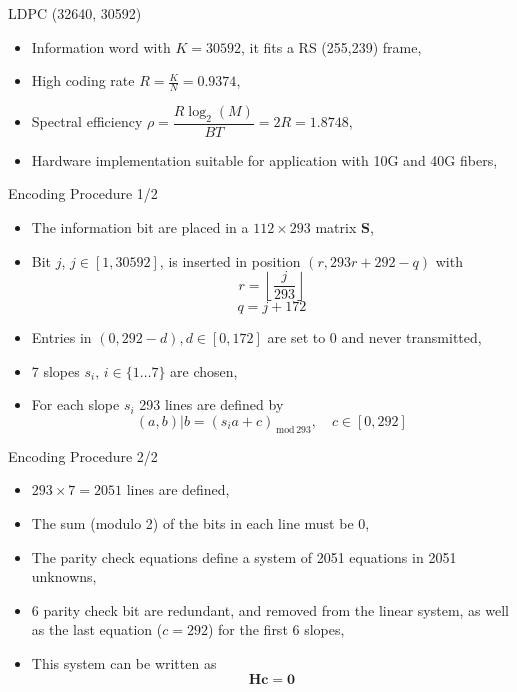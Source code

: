 \documentclass[pdf]
          {beamer}
\newcommand{\lmod}[1] {_{\,\mathrm{mod}\,#1}}
\begin{document}
\begin{frame}{LDPC (32640, 30592)}
	\begin{itemize}
		\item Information word with $K=30592$, it fits a RS (255,239) frame,
		\item High coding rate $R = \frac{K}{N} = 0.9374$,
		\item Spectral efficiency $\rho = \dfrac{R \log_2(M)}{BT} = 2R = 1.8748$,
		\item Hardware implementation suitable for application with 10G and 40G fibers,
	\end{itemize}
	
\end{frame}

\begin{frame}{Encoding Procedure 1/2}
	\begin{itemize}
		\item The information bit are placed in a $112\times 293$ matrix $\mathbf{S}$,
		\item Bit $j$, $j\in[1, 30592]$, is inserted in position $(r, 293r + 292 - q)$ with
		\begin{equation*}
			r = \left\lfloor\dfrac{j}{293}\right\rfloor
		\end{equation*}
		\begin{equation*}
			q = j + 172
		\end{equation*}
		\item Entries in $(0, 292-d), d \in [0, 172]$ are set to 0 and never transmitted,
		\item 7 slopes $s_i, \, i \in \{1 \dots 7\}$ are chosen,
		\item For each slope $s_i$ 293 lines are defined by
		\begin{equation*}
			(a, b) | b = (s_ia + c)\lmod{293}, \quad c \in [0, 292]
		\end{equation*}
	\end{itemize}
\end{frame}

\begin{frame}{Encoding Procedure 2/2}
	\begin{itemize}
		\item $293 \times 7 = 2051$ lines are defined,
		\item The sum (modulo 2) of the bits in each line must be 0,
		\item The parity check equations define a system of 2051 equations in 2051 unknowns,
		\item 6 parity check bit are redundant, and removed from the linear system, as well as the last equation ($c=292$) for the first 6 slopes,
		\item This system can be written as 
		\begin{equation*}
			\mathbf{H} \mathbf{c} = \mathbf{0}
		\end{equation*}
	\end{itemize}
\end{frame}
\end{document}
